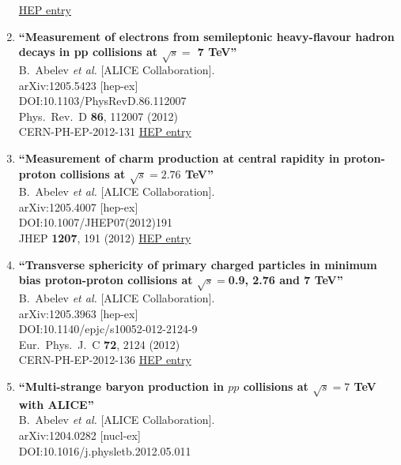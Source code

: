 \begin{enumerate}
\href{http://inspirehep.net/record/1116150}{HEP entry}
\item%
{\bf ``Measurement of electrons from semileptonic heavy-flavour hadron decays in pp collisions at $\sqrt{s} =$ 7 TeV''}
  \\{}B.~Abelev {\it et al.} [ALICE Collaboration].
  \\{}arXiv:1205.5423 [hep-ex]
  \\{}DOI:10.1103/PhysRevD.86.112007
  \\{}Phys.\ Rev.\ D {\bf 86}, 112007 (2012)
  \\{}CERN-PH-EP-2012-131
\href{http://inspirehep.net/record/1115824}{HEP entry}
\item%
{\bf ``Measurement of charm production at central rapidity in proton-proton collisions at $\sqrt{s}=2.76$ TeV''}
  \\{}B.~Abelev {\it et al.} [ALICE Collaboration].
  \\{}arXiv:1205.4007 [hep-ex]
  \\{}DOI:10.1007/JHEP07(2012)191
  \\{}JHEP {\bf 1207}, 191 (2012)
\href{http://inspirehep.net/record/1115187}{HEP entry}
\item%
{\bf ``Transverse sphericity of primary charged particles in minimum bias \linebreak proton-proton collisions at $\sqrt{s}=$0.9, 2.76 and 7 TeV''}
  \\{}B.~Abelev {\it et al.} [ALICE Collaboration].
  \\{}arXiv:1205.3963 [hep-ex]
  \\{}DOI:10.1140/epjc/s10052-012-2124-9
  \\{}Eur.\ Phys.\ J.\ C {\bf 72}, 2124 (2012)
  \\{}CERN-PH-EP-2012-136
\href{http://inspirehep.net/record/1115186}{HEP entry}
\item%
{\bf ``Multi-strange baryon production in $pp$ collisions at $\sqrt{s} = 7$ TeV with ALICE''}
  \\{}B.~Abelev {\it et al.} [ALICE Collaboration].
  \\{}arXiv:1204.0282 [nucl-ex]
  \\{}DOI:10.1016/j.physletb.2012.05.011

\end{enumerate}
